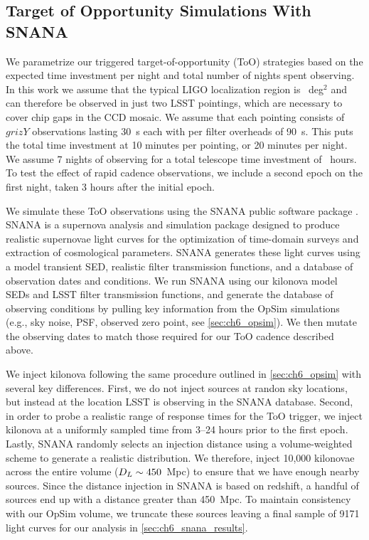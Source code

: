 \subsection{Target of Opportunity Simulations With SNANA}
\label{sec:ch6_snana}
We parametrize our triggered target-of-opportunity (ToO) strategies based on the expected time investment per night and total number of nights spent observing. In this work we assume that the typical LIGO localization region is ~deg$^2$ and can therefore be observed in just two LSST pointings, which are necessary to cover chip gaps in the CCD mosaic. We assume that each pointing consists of $grizY$ observations lasting 30~s each with per filter overheads of 90~s. This puts the total time investment at 10 minutes per pointing, or 20 minutes per night. We assume 7 nights of observing for a total telescope time investment of ~hours. To test the effect of rapid cadence observations, we include a second epoch on the first night, taken 3 hours after the initial epoch.

We simulate these ToO observations using the SNANA public software package \citep{SNANA}. SNANA is a supernova analysis and simulation package designed to produce realistic supernovae light curves for the optimization of time-domain surveys and extraction of cosmological parameters. SNANA generates these light curves using a model transient SED, realistic filter transmission functions, and a database of observation dates and conditions. We run SNANA using our kilonova model SEDs and LSST filter transmission functions, and generate the database of observing conditions by pulling key information from the OpSim simulations (e.g., sky noise, PSF, observed zero point, see \cref{sec:ch6_opsim}). We then mutate the observing dates to match those required for our ToO cadence described above.

We inject kilonova following the same procedure outlined in \cref{sec:ch6_opsim} with several key differences. First, we do not inject sources at randon sky locations, but instead at the location LSST is observing in the SNANA database. Second, in order to probe a realistic range of response times for the ToO trigger, we inject kilonova at a uniformly sampled time from 3--24 hours prior to the first epoch. Lastly, SNANA randomly selects an injection distance using a volume-weighted scheme to generate a realistic distribution. We therefore, inject 10,000 kilonovae across the entire volume ($D_L \sim450$~Mpc) to ensure that we have enough nearby sources. Since the distance injection in SNANA is based on redshift, a handful of sources end up with a distance greater than 450~Mpc. To maintain consistency with our OpSim volume, we truncate these sources leaving a final sample of 9171 light curves for our analysis in \cref{sec:ch6_snana_results}.

